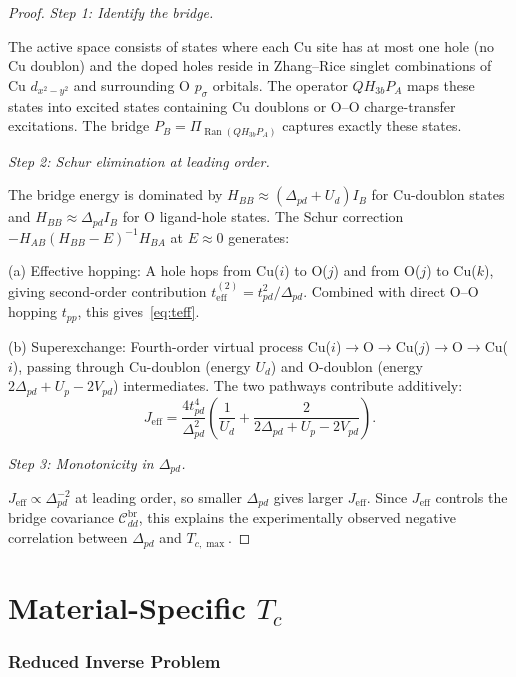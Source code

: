 \documentclass[12pt]{article}
\theoremstyle{plain}
\theoremstyle{definition}
\numberwithin{equation}{section}
\newcommand{\br}{\mathrm{br}}
\newcommand{\eff}{\mathrm{eff}}
\DeclareMathOperator{\Ran}{Ran}
\begin{document}
\begin{proof}
\emph{Step 1: Identify the bridge.}

The active space consists of states where each Cu site has at
most one hole (no Cu doublon) and the doped holes reside in
Zhang--Rice singlet combinations of Cu $d_{x^2-y^2}$ and
surrounding O $p_\sigma$ orbitals.  The operator $QH_{3b}P_A$
maps these states into excited states containing Cu doublons or
O--O charge-transfer excitations.  The bridge
$P_B=\Pi_{\Ran(QH_{3b}P_A)}$ captures exactly these states.

\emph{Step 2: Schur elimination at leading order.}

The bridge energy is dominated by
$H_{BB}\approx(\Delta_{pd}+U_d)I_B$ for Cu-doublon states and
$H_{BB}\approx\Delta_{pd}I_B$ for O ligand-hole states.
The Schur correction
$-H_{AB}(H_{BB}-E)^{-1}H_{BA}$ at $E\approx 0$ generates:

(a) Effective hopping: A hole hops from Cu($i$) to O($j$) and
from O($j$) to Cu($k$), giving second-order contribution
$t_{\eff}^{(2)}=t_{pd}^2/\Delta_{pd}$.  Combined with direct
O--O hopping $t_{pp}$, this gives~\eqref{eq:teff}.

(b) Superexchange: Fourth-order virtual process
Cu($i$)$\to$O$\to$Cu($j$)$\to$O$\to$Cu($i$), passing through
Cu-doublon (energy $U_d$) and O-doublon (energy
$2\Delta_{pd}+U_p-2V_{pd}$) intermediates.  The two pathways
contribute additively:
\begin{equation}
J_{\eff} = \frac{4t_{pd}^4}{\Delta_{pd}^2}
\left(\frac{1}{U_d}+\frac{2}{2\Delta_{pd}+U_p-2V_{pd}}\right).
\end{equation}

\emph{Step 3: Monotonicity in $\Delta_{pd}$.}

$J_{\eff}\propto\Delta_{pd}^{-2}$ at leading order, so smaller
$\Delta_{pd}$ gives larger $J_{\eff}$.  Since $J_{\eff}$ controls
the bridge covariance $\mathcal{C}_{dd}^{\br}$, this explains
the experimentally observed negative correlation between
$\Delta_{pd}$ and $T_{c,\max}$.
\end{proof}


\part{Material-Specific $T_c$}

\section{Reduced Inverse Problem}\label{sec:materialTc}
\end{document}
